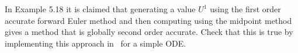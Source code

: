 

In Example 5.18 it is claimed that generating a value $U^1$ using the first
order accurate forward Euler method and then computing using the midpoint
method gives a method that is globally second order accurate.  Check that
this is true by implementing this approach in \matlab\ for a simple ODE.

